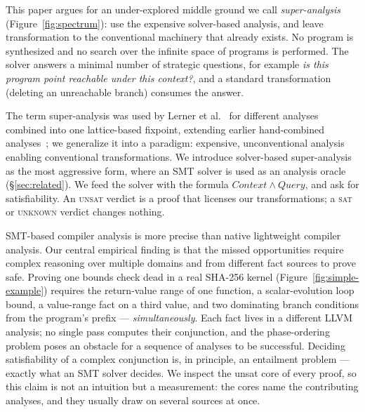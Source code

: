 \documentclass[acmsmall,screen,nonacm]{acmart}
\begin{document}
This paper argues for an under-explored middle ground we call \emph{super-analysis}
(Figure~\ref{fig:spectrum}): use
the expensive solver-based analysis, and leave transformation
to the conventional machinery that already exists. No program is synthesized and
no search over the infinite space of programs is performed. The solver answers a minimal number of strategic questions, for example \emph{is this program point reachable under this context?}, and a
standard transformation (deleting an unreachable branch)
consumes the answer.

The term super-analysis was used by Lerner et al.~\cite{lerner2002composing} for different analyses combined into one lattice-based fixpoint, extending earlier hand-combined analyses~\cite{wegman1991constant, click1995combining}; we generalize it into a paradigm: expensive, unconventional analysis enabling conventional transformations. We introduce solver-based super-analysis as the most aggressive form, where an SMT solver is used as an analysis oracle (\S\ref{sec:related}).
We feed the solver with the formula $\mathit{Context} \wedge \mathit{Query}$, and ask for satisfiability. An
\textsc{unsat} verdict is a proof that licenses our transformations; a \textsc{sat} or \textsc{unknown}
verdict changes nothing.


SMT-based compiler analysis is more precise than native lightweight compiler analysis. Our central empirical finding is that the missed opportunities require complex reasoning over multiple domains and from different fact sources to prove safe. Proving
one bounds check dead in a real SHA-256 kernel
(Figure~\ref{fig:simple-example}) requires the return-value
range of one function, a scalar-evolution loop bound, a value-range fact
on a third value, and two dominating branch conditions from the program's prefix ---
\emph{simultaneously}. Each fact lives in a different LLVM analysis; no
single pass computes their conjunction, and the phase-ordering problem
poses an obstacle for a sequence of analyses to be successful. Deciding satisfiability of a
complex conjunction is, in principle, an entailment
problem --- exactly what an SMT solver decides. We inspect the unsat core of every proof, so this
claim is not an intuition but a measurement: the cores name the
contributing analyses, and they usually draw on several sources at once.
\end{document}
